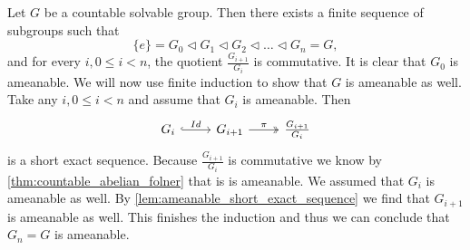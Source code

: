 Let $G$ be a countable solvable group. Then there exists a finite sequence of subgroups such that 
$$\{e\} = G_0 \triangleleft G_1 \triangleleft G_2 \triangleleft \dots \triangleleft G_n = G,$$ and for every $i, 0\le i<n$, the quotient $\frac{G_{i+1}}{G_i}$ is commutative. 
It is clear that $G_0$ is ameanable. We will now use finite induction to show that $G$ is ameanable as well. 
Take any $i, 0\le i<n$ and assume that $G_i$ is ameanable. Then 
\[\begin{tikzcd}
    G_i \arrow[r, "Id", hook] & G_{i+1} \arrow[r, "\pi", two heads] & \frac{G_{i+1}}{G_i}
    \end{tikzcd}\]
is a short exact sequence. Because $\frac{G_{i+1}}{G_i}$ is commutative we know by \cref{thm:countable_abelian_folner} that is is ameanable. We assumed that $G_i$ is ameanable as well. By \cref{lem:ameanable_short_exact_sequence} we find that $G_{i+1}$ is ameanable as well. This finishes the induction and thus we can conclude that $G_n = G$ is ameanable.
